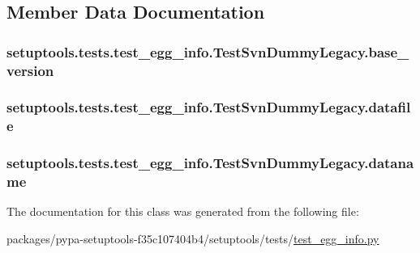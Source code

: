 \subsection{Member Data Documentation}
\hypertarget{classsetuptools_1_1tests_1_1test__egg__info_1_1TestSvnDummyLegacy_aa5b4ffbb0d5156317874ca3340c61ed3}{}
\subsubsection[{base\+\_\+version}]{\setlength{\rightskip}{0pt plus 5cm}setuptools.\+tests.\+test\+\_\+egg\+\_\+info.\+Test\+Svn\+Dummy\+Legacy.\+base\+\_\+version}\label{classsetuptools_1_1tests_1_1test__egg__info_1_1TestSvnDummyLegacy_aa5b4ffbb0d5156317874ca3340c61ed3}
\hypertarget{classsetuptools_1_1tests_1_1test__egg__info_1_1TestSvnDummyLegacy_a822db7b44dffb842e034c9f60be5ba53}{}
\subsubsection[{datafile}]{\setlength{\rightskip}{0pt plus 5cm}setuptools.\+tests.\+test\+\_\+egg\+\_\+info.\+Test\+Svn\+Dummy\+Legacy.\+datafile}\label{classsetuptools_1_1tests_1_1test__egg__info_1_1TestSvnDummyLegacy_a822db7b44dffb842e034c9f60be5ba53}
\hypertarget{classsetuptools_1_1tests_1_1test__egg__info_1_1TestSvnDummyLegacy_a0531c53d8cf53ab2f0f0ed6a05f89341}{}
\subsubsection[{dataname}]{\setlength{\rightskip}{0pt plus 5cm}setuptools.\+tests.\+test\+\_\+egg\+\_\+info.\+Test\+Svn\+Dummy\+Legacy.\+dataname}\label{classsetuptools_1_1tests_1_1test__egg__info_1_1TestSvnDummyLegacy_a0531c53d8cf53ab2f0f0ed6a05f89341}


The documentation for this class was generated from the following file\+:\begin{DoxyCompactItemize}
\item 
packages/pypa-\/setuptools-\/f35c107404b4/setuptools/tests/\hyperlink{test__egg__info_8py}{test\+\_\+egg\+\_\+info.\+py}\end{DoxyCompactItemize}

